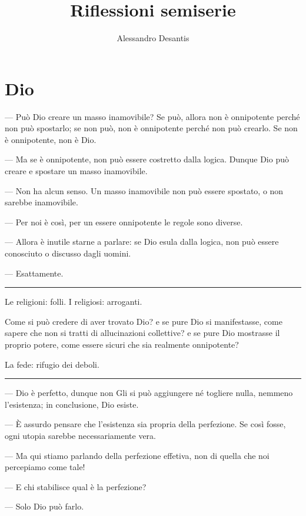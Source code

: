 \documentclass[a4paper,oneside,11pt]{memoir}
\title{Riflessioni semiserie}
\author{Alessandro Desantis}
\date{}
\begin{document}
\begin{titlingpage}
\maketitle
\end{titlingpage}

\mainmatter

\chapter{Dio}

--- Può Dio creare un masso inamovibile? Se può, allora non è onnipotente perché
non può spostarlo; se non può, non è onnipotente perché non può crearlo. Se
non è onnipotente, non è Dio.

--- Ma se è onnipotente, non può essere costretto dalla logica. Dunque Dio
può creare e spostare un masso inamovibile.

--- Non ha alcun senso. Un masso inamovibile non può essere spostato, o non
sarebbe inamovibile.

--- Per noi è così, per un essere onnipotente le regole sono diverse.

--- Allora è inutile starne a parlare: se Dio esula dalla logica, non può essere
conosciuto o discusso dagli uomini.

--- Esattamente.

\plainbreak{1}

Le religioni: folli. I religiosi: arroganti.

Come si può credere di aver trovato Dio? e se pure Dio si manifestasse, come
sapere che non si tratti di allucinazioni collettive? e se pure Dio mostrasse il
proprio potere, come essere sicuri che sia realmente onnipotente?

La fede: rifugio dei deboli.

\plainbreak{1}

--- Dio è perfetto, dunque non Gli si può aggiungere né togliere nulla,
nemmeno l'esistenza; in conclusione, Dio esiste.

--- È assurdo pensare che l'esistenza sia propria della perfezione. Se così
fosse, ogni utopia sarebbe necessariamente vera.

--- Ma qui stiamo parlando della perfezione effetiva, non di quella che noi
percepiamo come tale!

--- E chi stabilisce qual è la perfezione?

--- Solo Dio può farlo.
\end{document}
